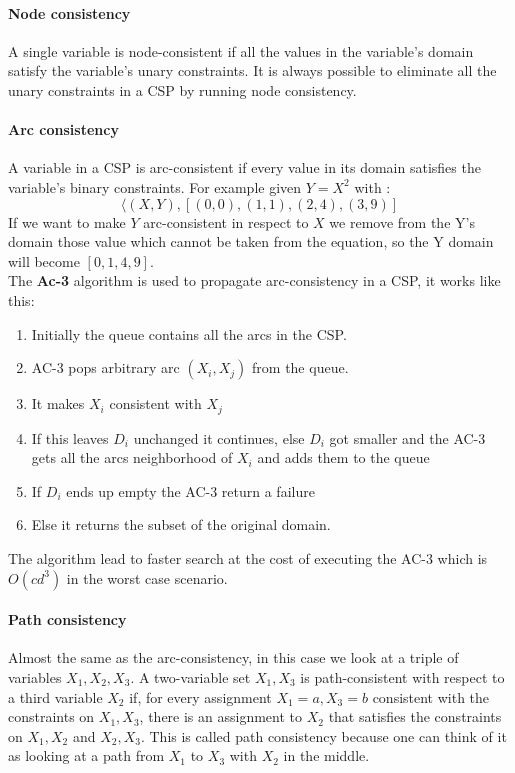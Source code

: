 \documentclass[10pt,a4paper]{article}
\begin{document}
\paragraph{Node consistency} 
A single variable is node-consistent if all the values in the variable's domain satisfy the variable's unary constraints. It is always possible to eliminate all the unary constraints in a CSP by running node consistency.

\paragraph{Arc consistency}
A variable in a CSP is arc-consistent if every value in its domain satisfies the variable’s binary constraints. 
For example given $Y=X^2$ with :
\[\langle(X,Y),[(0,0),(1,1),(2,4),(3,9)]\]
If we want to make $Y$ arc-consistent in respect to $X$ we remove from the Y's domain those value which cannot be taken from the equation, so the Y domain will become $[0,1,4,9]$.\\
The \textbf{Ac-3} algorithm is used to propagate arc-consistency in a CSP, it works like this:
\begin{enumerate}
\label{AC3}
\item Initially the queue contains all the arcs in the CSP.
\item AC-3 pops arbitrary arc $(X_i,X_j)$ from the queue.
\item It makes $X_i$ consistent with $X_j$
\item If this leaves $D_i$ unchanged it continues, else $D_i$ got smaller and the AC-3 gets all the arcs neighborhood of $X_i$ and adds them to the queue
\item If $D_i$ ends up empty the AC-3 return a failure
\item Else it returns the subset of the original domain.
\end{enumerate}

The algorithm lead to faster search at the cost of executing the AC-3 which is $O(cd^3)$ in the worst case scenario.

\paragraph{Path consistency}
Almost the same as the arc-consistency, in this case we look at a triple of variables $X_1,X_2,X_3$.
A two-variable set ${X_1,X_3}$ is path-consistent with respect to a third variable $X_2$ if, for every assignment ${X_1 = a, X_3 = b}$ consistent with the constraints on ${X_1 , X_3 }$, there is an assignment to $X_2$ that satisfies the constraints on ${X_1 , X_2 }$ and ${X_2 , X_3 }$. This is called path consistency because one can think of it as looking at a path from $X_1$ to $X_3$ with $X_2$ in the middle.
\end{document}
